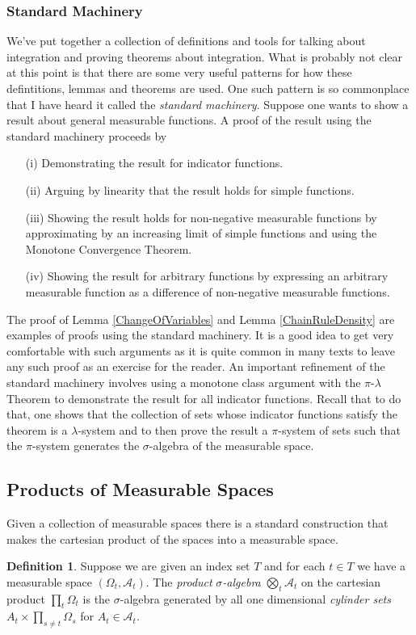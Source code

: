 \documentclass{amsart}
\theoremstyle{remark}
\theoremstyle{definition}
\newtheorem{defn}[thm]{Definition}
\begin{document}
\subsubsection{Standard Machinery}
We've put together a collection of definitions and tools for
talking about integration and proving theorems about integration.
What is probably not clear at this point is that there are some very
useful patterns for how these defintitions, lemmas and theorems are
used.  One such pattern is so commonplace that I have heard it called
the \emph{standard machinery}.  
Suppose one wants to show a result about general measurable
functions.  A proof of the result using the standard machinery proceeds by 
\begin{itemize}
\item[(i)]Demonstrating the result for indicator functions.
\item[(ii)]Arguing by linearity that the result holds for simple functions.
\item[(iii)]Showing the result holds for non-negative measurable
  functions by approximating by an increasing limit of simple
  functions and using the Monotone Convergence Theorem.
\item[(iv)]Showing the result for arbitrary functions by expressing an
  arbitrary measurable function as a difference of non-negative
  measurable functions.
\end{itemize}
The proof of Lemma \ref{ChangeOfVariables} and Lemma
\ref{ChainRuleDensity} are examples of proofs
using the standard machinery.  It is a good idea to get very
comfortable with such arguments as it is quite common in many texts to
leave any such proof as an exercise for the reader.  An important refinement of the standard machinery involves using a
monotone class argument with the $\pi$-$\lambda$ Theorem to demonstrate the result for all indicator
functions.  Recall that to do that, one shows that the collection of
sets whose indicator functions satisfy the theorem is a
$\lambda$-system and to then prove the result a $\pi$-system of sets
such that the $\pi$-system generates the $\sigma$-algebra of the
measurable space.
\subsection{Products of Measurable Spaces}

Given a collection of measurable spaces there is a standard
construction that makes the cartesian product of the spaces into a
measurable space.
\begin{defn}Suppose we are given an index set $T$ and for each $t \in
  T$ we have a measurable space $(\Omega_t, \mathcal{A}_t)$.  The
  \emph{product} $\sigma$\emph{-algebra} $\bigotimes_t \mathcal{A}_t$ on the cartesian product
  $\prod_t \Omega_t$ is the $\sigma$-algebra
  generated by all one dimensional \emph{cylinder sets} $A_t \times
  \prod_{s \neq t} \Omega_s$ for $A_t \in \mathcal{A}_t$.
\end{defn}
\end{document}
